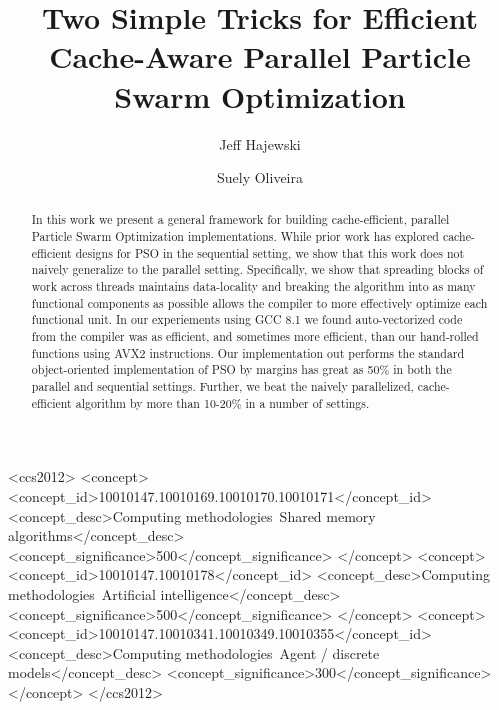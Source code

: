 \documentclass[sigconf]{acmart}
\begin{document}
\title{Two Simple Tricks for Efficient Cache-Aware Parallel Particle Swarm Optimization}
\author{Jeff Hajewski}

\author{Suely Oliveira}

\renewcommand{\shortauthors}{J. Hajewski et al.}


\begin{abstract}
  In this work we present a general framework for building cache-efficient,
  parallel Particle Swarm Optimization implementations.  While prior work
  \cite{cache-pso} has explored cache-efficient designs for PSO in the
  sequential setting, we show that this work does not naively generalize to the
  parallel setting.  Specifically, we show that spreading blocks of work across
  threads maintains data-locality and breaking the algorithm into as many
  functional components as possible allows the compiler to more effectively
  optimize each functional unit.  In our experiements using GCC 8.1
  we found auto-vectorized code from the compiler was as efficient, and
  sometimes more efficient, than our hand-rolled functions using AVX2
  instructions.  Our implementation out performs the standard object-oriented
  implementation of PSO by margins has great as 50\% in both the parallel and
  sequential settings. Further, we beat the naively parallelized,
  cache-efficient algorithm by more than 10-20\% in a number of settings.
\end{abstract}

%
%
\begin{CCSXML}
<ccs2012>
<concept>
<concept_id>10010147.10010169.10010170.10010171</concept_id>
<concept_desc>Computing methodologies~Shared memory algorithms</concept_desc>
<concept_significance>500</concept_significance>
</concept>
<concept>
<concept_id>10010147.10010178</concept_id>
<concept_desc>Computing methodologies~Artificial intelligence</concept_desc>
<concept_significance>500</concept_significance>
</concept>
<concept>
<concept_id>10010147.10010341.10010349.10010355</concept_id>
<concept_desc>Computing methodologies~Agent / discrete models</concept_desc>
<concept_significance>300</concept_significance>
</concept>
</ccs2012>
\end{CCSXML}
\end{document}
